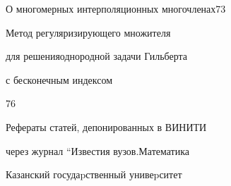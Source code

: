 

{О многомерных интерполяционных многочленах}{73}




{Метод регуляризирующего множителя


для решения\newline однородной задачи Гильберта


с бесконечным индексом}{76}


\bigskip





\noindent{}Рефераты статей, депонированных в ВИНИТИ


через журнал ``Известия вузов.\newline Математика














\vfill


\noindent\raisebox{2pt}{\copyright} Казанский госудаpственный унивеpситет





